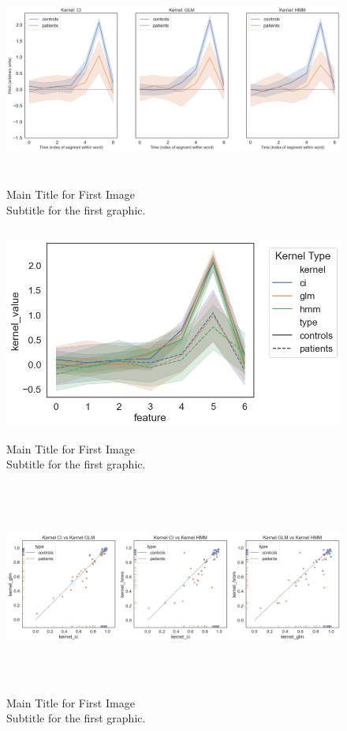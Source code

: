 \begin{figure}[H]
    \centering
    \includegraphics[width=17cm,height=7cm]{MainLayout/Images/chapter8/kernels_segments_methods.png}
    \caption{Main Title for First Image \\ \small Subtitle for the first graphic.}
    \label{fig:kernels_segments_methods}
\end{figure}
\begin{figure}[H]
    \centering
    \includegraphics[width=13cm,height=7cm]{MainLayout/Images/chapter8/kernels_comparisons.png}
    \caption{Main Title for First Image \\ \small Subtitle for the first graphic.}
    \label{fig:kernels_comparisons}
\end{figure}
\begin{figure}[H]
    \centering
    \includegraphics[width=17cm,height=7cm]{MainLayout/Images/chapter8/kernels_methods_participants.png}
    \caption{Main Title for First Image \\ \small Subtitle for the first graphic.}
    \label{fig:kernels_methods_participants}
\end{figure}

